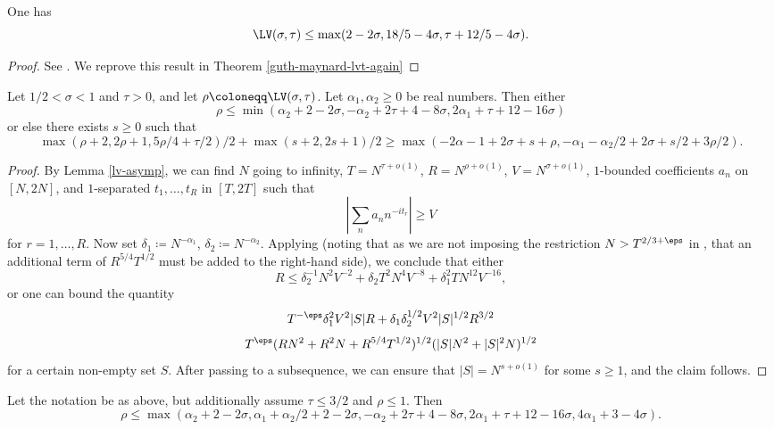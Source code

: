 \begin{theorem}\label{guth-maynard-lvt} One has
$$ \LV(\sigma,\tau) \leq \max(2-2\sigma, 18/5 - 4 \sigma, \tau + 12/5 - 4\sigma).$$  
\end{theorem}

\begin{proof}
See \cite[Theorem~1.1]{guth-maynard}. We reprove this result in Theorem \ref{guth-maynard-lvt-again}
\end{proof}

\begin{theorem}\label{bourgain-lvt} \cite{bourgain_large_2000} Let $1/2 < \sigma < 1$ and $\tau > 0$, and let $\rho \coloneqq \LV(\sigma,\tau)$.  Let $\alpha_1, \alpha_2 \geq 0$ be real numbers.  Then either
$$ \rho \leq \min( \alpha_2 + 2 - 2 \sigma, -\alpha_2 + 2\tau+4-8\sigma, 2\alpha_1 + \tau + 12 - 16 \sigma)$$
or else there exists $s \geq 0$ such that
\begin{equation}\label{rs}
     \max(\rho+2, 2\rho+1, 5\rho/4 + \tau/2)/2 + \max(s+2, 2s+1)/2 \geq
\max( -2\alpha-1 + 2\sigma + s + \rho, -\alpha_1 - \alpha_2/2 + 2\sigma + s/2 + 3\rho/2).
\end{equation}
\end{theorem}

\begin{proof}  By Lemma \ref{lv-asymp}, we can find $N$ going to infinity, $T = N^{\tau+o(1)}$, $R = N^{\rho+o(1)}$, $V = N^{\sigma+o(1)}$, $1$-bounded coefficients $a_n$ on $[N,2N]$, and $1$-separated $t_1,\dots,t_R$ in $[T,2T]$ such that
$$ |\sum_n a_n n^{-it_r}| \geq V$$
for $r=1,\dots,R$.  Now set $\delta_1 \coloneqq N^{-\alpha_1}$, $\delta_2 \coloneqq N^{-\alpha_2}$.  Applying \cite[(4.41), (4.42), (4.55), (4.57)]{bourgain_large_2000} (noting that as we are not imposing the restriction $N > T^{2/3+\eps}$ in \cite[Lemma 3.7]{bourgain_large_2000}, that an additional term of $R^{5/4} T^{1/2}$ must be added to the right-hand side), we conclude that either
$$ R \leq \delta_2^{-1} N^2 V^{-2} + \delta_2 T^2 N^4 V^{-8} + \delta_1^2 T N^{12} V^{-16},$$
or one can bound the quantity 
$$ T^{-\eps} \delta_1^2 V^2 |S| R + \delta_1 \delta_2^{1/2} V^2 |S|^{1/2} R^{3/2}$$
$$ T^\eps (RN^2 + R^2 N + R^{5/4} T^{1/2})^{1/2} (|S| N^2 + |S|^2 N)^{1/2}$$
for a certain non-empty set $S$.  After passing to a subsequence, we can ensure that $|S| = N^{s+o(1)}$ for some $s \geq 1$, and the claim follows.
\end{proof}

\begin{corollary}\label{borg-lv-simp} \cite[Lemma 4.60]{bourgain_large_2000} Let the notation be as above, but additionally assume $\tau \leq 3/2$ and $\rho \leq 1$.  Then
$$ \rho \leq \max( \alpha_2 + 2 - 2 \sigma, \alpha_1+\alpha_2/2 + 2-2\sigma, -\alpha_2 + 2\tau+4-8\sigma, 2\alpha_1 + \tau + 12 - 16 \sigma, 4\alpha_1 + 3-4\sigma).$$
\end{corollary}

